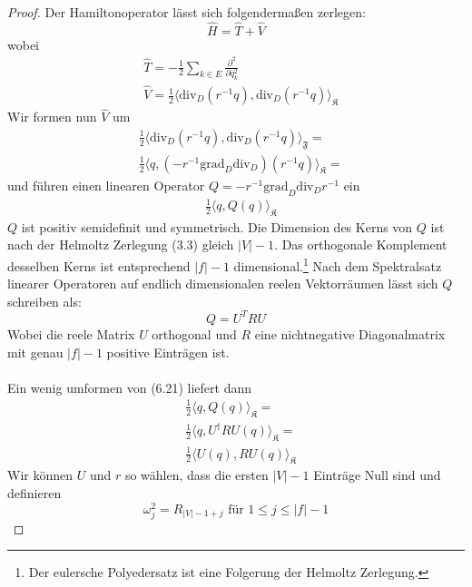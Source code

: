 \documentclass[11pt,a4paper,leqno]{report}
\numberwithin{equation}{chapter}
\begin{document}
\begin{proof}
	Der Hamiltonoperator l\"asst sich folgenderma\ss{}en zerlegen:
	\begin{equation*}
		\hat{H} = \hat{T} + \hat{V}
	\end{equation*}
	wobei
	\begin{align*}
		&\hat{T} = -\frac{1}{2}\sum_{k\in E}\frac{\partial^2}{\partial q_k^2}\\
	    &\hat{V} = \frac{1}{2}\langle \text{div}_D(r^{-1}q), \text{div}_D(r^{-1}q)\rangle_{\mathfrak{K}}
	\end{align*}
	Wir formen nun $\hat{V}$ um
	\begin{align*}
		&\frac{1}{2}\langle \text{div}_D(r^{-1}q), \text{div}_D(r^{-1}q)\rangle_{\mathfrak{F}}=\\
		&\frac{1}{2}\langle q, (-r^{-1}\text{grad}_D\text{div}_D)(r^{-1}q)\rangle_{\mathfrak{K}}=
	\end{align*}
	und f\"uhren einen linearen Operator $Q=-r^{-1}\text{grad}_D\text{div}_Dr^{-1}$ ein
	\begin{align}
		&\frac{1}{2}\langle q, Q(q)\rangle_{\mathfrak{K}}
	\end{align}
	$Q$ ist positiv semidefinit und symmetrisch. Die Dimension des Kerns von $Q$ ist nach der Helmoltz Zerlegung (3.3) gleich $|V| - 1$. Das orthogonale Komplement desselben Kerns ist entsprechend $|f| - 1$ dimensional.\footnote{Der eulersche Polyedersatz ist eine Folgerung der Helmoltz Zerlegung.}
	Nach dem Spektralsatz linearer Operatoren auf endlich dimensionalen reelen Vektorr\"aumen l\"asst sich $Q$ schreiben als:
	\begin{equation*}
		Q = U^T R U
	\end{equation*}
	Wobei die reele Matrix $U$ orthogonal und $R$ eine nichtnegative Diagonalmatrix mit genau $|f| - 1$ positive Eintr\"agen ist. \\
	\\
	Ein wenig umformen von (6.21) liefert dann
	\begin{align*}
		&\frac{1}{2}\langle q, Q(q)\rangle_{\mathfrak{K}}=\\
		&\frac{1}{2}\langle q, U^\dagger R U(q)\rangle_{\mathfrak{K}}=\\
		&\frac{1}{2}\langle U(q), R U(q)\rangle_{\mathfrak{K}}
	\end{align*}
	Wir k\"onnen $U$ und $r$ so w\"ahlen, dass die ersten $|V|-1$ Eintr\"age Null sind und definieren 
	\begin{equation*}
		\omega_j^2 = R_{|V|-1 + j} \text{ f\"ur }1\leq j \leq |f| - 1

\end{equation*}
\end{proof}
\end{document}
